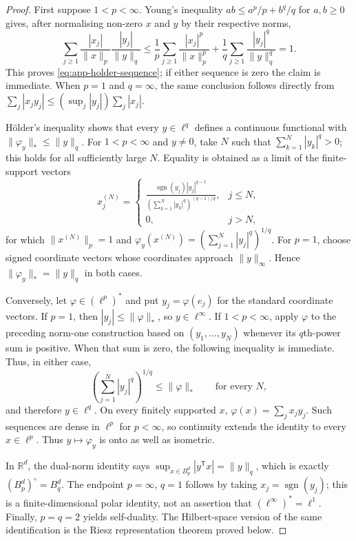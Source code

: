 \begin{proof}
First suppose $1<p<\infty$.  Young's inequality
$ab\leq a^p/p+b^q/q$ for $a,b\geq0$ gives, after normalising non-zero
$x$ and $y$ by their respective norms,
\[
  \sum_{j\geq1}
  \frac{|x_j|}{\|x\|_p}\frac{|y_j|}{\|y\|_q}
  \leq
  \frac1p\sum_{j\geq1}\frac{|x_j|^p}{\|x\|_p^p}
  +\frac1q\sum_{j\geq1}\frac{|y_j|^q}{\|y\|_q^q}
  =1.
\]
This proves \eqref{eq:app-holder-sequence}; if either sequence is zero the
claim is immediate.  When $p=1$ and $q=\infty$, the same conclusion follows
directly from
$\sum_j|x_jy_j|\leq(\sup_j|y_j|)\sum_j|x_j|$.

H\"older's inequality shows that every $y\in\ell^q$ defines a continuous
functional with $\|\varphi_y\|_*\leq\|y\|_q$.  For
$1<p<\infty$ and $y\neq0$, take $N$ such that
$\sum_{k=1}^{N}|y_k|^q>0$; this holds for all sufficiently large $N$.
Equality is obtained as a limit of the finite-support vectors
\[
  x_j^{(N)}=
  \begin{cases}
  \displaystyle
  \frac{\operatorname{sgn}(y_j)|y_j|^{q-1}}
       {\left(\sum_{k=1}^{N}|y_k|^q\right)^{(q-1)/q}},
       &j\leq N,\\[1.2ex]
  0,&j>N,
  \end{cases}
\]
for which $\|x^{(N)}\|_p=1$ and
$\varphi_y(x^{(N)})=(\sum_{j=1}^{N}|y_j|^q)^{1/q}$.
For $p=1$, choose signed coordinate vectors whose coordinates approach
$\|y\|_\infty$.  Hence $\|\varphi_y\|_*=\|y\|_q$ in both cases.

Conversely, let $\varphi\in(\ell^p)^*$ and put
$y_j=\varphi(e_j)$ for the standard coordinate vectors.  If $p=1$, then
$|y_j|\leq\|\varphi\|_*$, so $y\in\ell^\infty$.  If $1<p<\infty$, apply
$\varphi$ to the preceding norm-one construction based on
$(y_1,\ldots,y_N)$ whenever its $q$th-power sum is positive.  When that
sum is zero, the following inequality is immediate.  Thus, in either case,
\[
   \left(\sum_{j=1}^{N}|y_j|^q\right)^{1/q}
   \leq\|\varphi\|_*
   \qquad\text{for every }N,
\]
and therefore $y\in\ell^q$.  On every finitely supported $x$,
$\varphi(x)=\sum_jx_jy_j$.  Such sequences are dense in $\ell^p$ for
$p<\infty$, so continuity extends the identity to every $x\in\ell^p$.
Thus $y\mapsto\varphi_y$ is onto as well as isometric.

In $\mathbb R^d$, the dual-norm identity says
$\sup_{x\in B_p^d}|y^{\mathsf T}x|=\|y\|_q$, which is exactly
$(B_p^d)^\circ=B_q^d$.  The endpoint $p=\infty$, $q=1$ follows by taking
$x_j=\operatorname{sgn}(y_j)$; this is a finite-dimensional polar identity,
not an assertion that $(\ell^\infty)^*=\ell^1$.  Finally, $p=q=2$ yields
self-duality.  The Hilbert-space version of the same identification is the
Riesz representation theorem proved below.
\end{proof}


